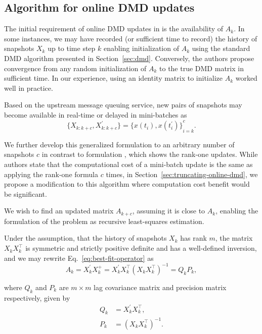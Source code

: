 \subsection{Algorithm for online DMD updates}\label{sec:online-dmd-updates}
The initial requirement of online DMD updates in \citet{Zhang2019} is the availability of \(A_{k}\). In some instances, we may have recorded (or sufficient time to record) the history of snapshots \(X_k\) up to time step \(k\) enabling initialization of \(A_k\) using the standard DMD algorithm presented in Section~\ref{sec:dmd}. Conversely, the authors propose convergence from any random initialization of \(A_k\) to the true DMD matrix in sufficient time\citep{Zhang2019}. In our experience, using an identity matrix to initialize \(A_k\) worked well in practice.

Based on the upstream message queuing service, new pairs of snapshots may become available in real-time or delayed in mini-batches as
\begin{equation}
	\{X_{k : k + c}, X^\prime_{k : k + c}\} = {\{x(t_i), x(t_i^\prime )\}}^c_{i=k}.
\end{equation}

We further develop this generalized formulation to an arbitrary number of snapshots \(c\) in contrast to formulation \citet{Zhang2019}, which shows the rank-one updates. While authors state that the computational cost of a mini-batch update is the same as applying the rank-one formula \(c\) times, in Section~\ref{sec:truncating-online-dmd}, we propose a modification to this algorithm where computation cost benefit would be significant.

We wish to find an updated matrix \(A_{k+c}\), assuming it is close to \(A_{k}\), enabling the formulation of the problem as recursive least-squares estimation\citep{Zhang2019}.

Under the assumption, that the history of snapshots \(X_k\) has rank \(m\), the matrix \(X_k X_k^\top \) is symmetric and strictly positive definite and has a well-defined inversion, and we may rewrite Eq.~\eqref{eq:best-fit-operator} as
\begin{equation}\label{eq:pseudo-inverse}
	A_k = X^\prime_k X_k^+ = X^\prime_k X_k^\top {(X_k X_k^\top)}^{-1} = Q_k P_k,
\end{equation}

where \(Q_k\) and \(P_k\) are \(m \times m\) lag covariance matrix and precision matrix respectively, given by
\begin{align}\label{eq:aux-matrices}
	Q_k & = X^\prime_k X_k^\top,   \\
	P_k & = {(X_k X_k^\top)}^{-1}.
\end{align}


